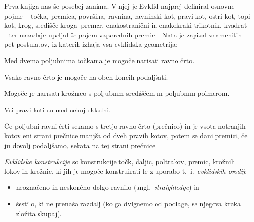 Prva knjiga nas še posebej zanima. V njej je Evklid najprej definiral osnovne pojme -- točka, premica, površina, ravnina, ravninski kot, pravi kot, ostri kot, topi kot, krog, središče kroga, premer, enakostranični in enakokraki trikotnik, kvadrat \ldots ter nazadnje upeljal še pojem vzporednih premic~\cite{euclidI}. Nato je zapisal znamenitih pet postulatov, iz katerih izhaja vsa evklidska geometrija:

\renewcommand{\thepostulat}{P\arabic{postulat}}

\begin{postulat}
    \label{post:P1}
    Med dvema poljubnima točkama je mogoče narisati ravno črto.
\end{postulat}
\begin{postulat}
    \label{post:P2}
    Vsako ravno črto je mogoče na obeh koncih podaljšati.
\end{postulat}
\begin{postulat}
    \label{post:P3}
    Mogoče je narisati krožnico s poljubnim središčem in poljubnim polmerom.
\end{postulat}
\begin{postulat}
    \label{post:P4}
    Vsi pravi koti so med seboj skladni.
\end{postulat}
\begin{postulat}
    \label{post:P5}
    Če poljubni ravni črti sekamo s tretjo ravno črto (prečnico) in je vsota notranjih kotov eni strani prečnice manjša od dveh pravih kotov, potem se dani premici, če ju dovolj podaljšamo, sekata na tej strani prečnice.
\end{postulat}

\begin{definicija}
    \emph{Evklidske konstrukcije} so konstrukcije točk, daljic, poltrakov, premic, krožnih lokov in krožnic, ki jih je mogoče konstruirati le z uporabo t.\ i.\ \emph{evklidskih orodij}:
    \begin{itemize}
        \item neoznačeno in neskončno dolgo ravnilo (angl.\ \emph{straightedge}) in
        \item šestilo, ki ne prenaša razdalj (ko ga dvignemo od podlage, se njegova kraka zložita skupaj).
    \end{itemize}
\end{definicija}

